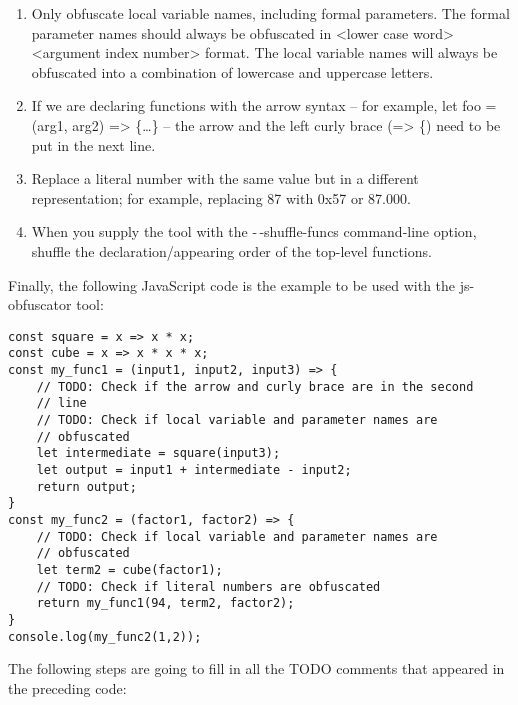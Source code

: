\begin{enumerate}
\item Only obfuscate local variable names, including formal parameters. The formal parameter names should always be obfuscated in <lower case word><argument index number> format. The local variable names will always be obfuscated into a combination of lowercase and uppercase letters.

\item If we are declaring functions with the arrow syntax – for example, let foo = (arg1, arg2) => \{…\} – the arrow and the left curly brace (=> \{) need to be put in the next line.
	
\item Replace a literal number with the same value but in a different representation; for example, replacing 87 with 0x57 or 87.000.

\item When you supply the tool with the -\,-shuffle-funcs command-line option, shuffle the declaration/appearing order of the top-level functions.

\end{enumerate}

Finally, the following JavaScript code is the example to be used with the js-obfuscator tool:

\begin{lstlisting}[style=styleJavaScript]
const square = x => x * x;
const cube = x => x * x * x;
const my_func1 = (input1, input2, input3) => {
	// TODO: Check if the arrow and curly brace are in the second
	// line
	// TODO: Check if local variable and parameter names are
	// obfuscated
	let intermediate = square(input3);
	let output = input1 + intermediate - input2;
	return output;
}
const my_func2 = (factor1, factor2) => {
	// TODO: Check if local variable and parameter names are
	// obfuscated
	let term2 = cube(factor1);
	// TODO: Check if literal numbers are obfuscated
	return my_func1(94, term2, factor2);
}
console.log(my_func2(1,2));
\end{lstlisting}


The following steps are going to fill in all the TODO comments that appeared in the preceding code:

